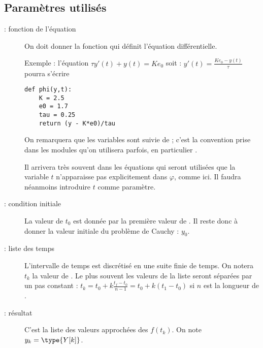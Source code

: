 \subsection{Paramètres utilisés}
\begin{description}
\item[ : fonction de l'équation] On doit donner la fonction qui définit l'équation différentielle.

Exemple : l'équation $\tau y'(t)+y(t)=Ke_0$ soit : $y'(t)=\frac{Ke_0-y(t)}{\tau}$ pourra s'écrire
\begin{lstlisting}
def phi(y,t):
    K = 2.5
    e0 = 1.7
    tau = 0.25
    return (y - K*e0)/tau
\end{lstlisting}
On remarquera que les variables sont  suivie de ; c'est la convention prise dans les modules qu'on utilisera parfois, en particulier .

Il arrivera très souvent dans les équations qui seront utilisées que la variable $t$ n'apparaisse pas explicitement dans $\varphi$, comme ici. Il faudra néanmoins introduire $t$ comme paramètre.
\item[ : condition initiale] La valeur de $t_0$ est donnée par la première valeur de . Il reste donc à donner la valeur initiale du problème de Cauchy : $y_0$.
\item[ : liste des temps] L'intervalle de temps est discrétisé en une suite finie de temps. On notera $t_k$ la valeur de . Le plus souvent les valeurs de la liste seront séparées par un pas constant : $t_k = t_0 + k\frac{t_f - t_0}{n-1}=t_0+k(t_1-t_0)$ si $n$ est la longueur de .
\item[ : résultat] C'est la liste des valeurs approchées des $f(t_k)$. On note $y_k = \type{Y[k]}$.
\end{description}
